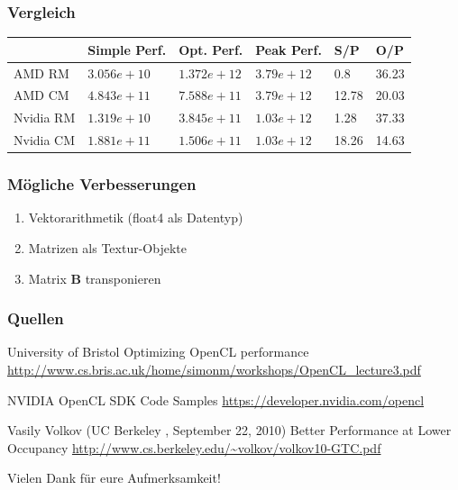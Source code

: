 \documentclass{beamer}
\begin{document}
\begin{frame}
\frametitle{Vergleich}

\begin{tabular}{|l|l|l|l|l|l|}
	\hline  & Simple Perf. & Opt. Perf. & Peak Perf. & S/P & O/P \\ 
	\hline AMD RM & $3.056e+10$ & $1.372e+12$ & $3.79e+12$ & 0.8 & 36.23 \\ 
	\hline AMD CM & $4.843e+11$ & $7.588e+11$ & $3.79e+12$ & 12.78 & 20.03 \\ 
	\hline Nvidia RM & $ 1.319e+10$ & $3.845e+11$ & $1.03e+12$ & 1.28 & 37.33 \\ 
	\hline Nvidia CM & $ 1.881e+11$ & $1.506e+11$ & $1.03e+12$ & 18.26 & 14.63 \\ 
	\hline 
	\end{tabular} 
	
\end{frame}


\begin{frame}
\frametitle{M\"ogliche Verbesserungen}

\begin{enumerate}
\item Vektorarithmetik (float4 als Datentyp)
\item Matrizen als Textur-Objekte
\item Matrix \textbf{B} transponieren 
\end{enumerate}

 
\end{frame}














\begin{frame}
\frametitle{Quellen}


\footnotesize{
\begin{thebibliography}{99}
  University of Bristol
 \newblock Optimizing OpenCL performance
 \newblock \url{http://www.cs.bris.ac.uk/home/simonm/workshops/OpenCL_lecture3.pdf} 
\end{thebibliography}
}



\footnotesize{
\begin{thebibliography}{99}
 NVIDIA 
 \newblock OpenCL SDK Code Samples
 \newblock \url{https://developer.nvidia.com/opencl} 
\end{thebibliography}
}


\footnotesize{
\begin{thebibliography}{99}
  Vasily Volkov
(UC Berkeley , September 22, 2010)
 \newblock Better Performance at Lower Occupancy 
 \newblock \url{http://www.cs.berkeley.edu/~volkov/volkov10-GTC.pdf} 
\end{thebibliography}
}





\end{frame}
 
 
 
\begin{frame}
\centerline{Vielen Dank f{\"u}r eure Aufmerksamkeit!}
\end{frame}
\end{document}
